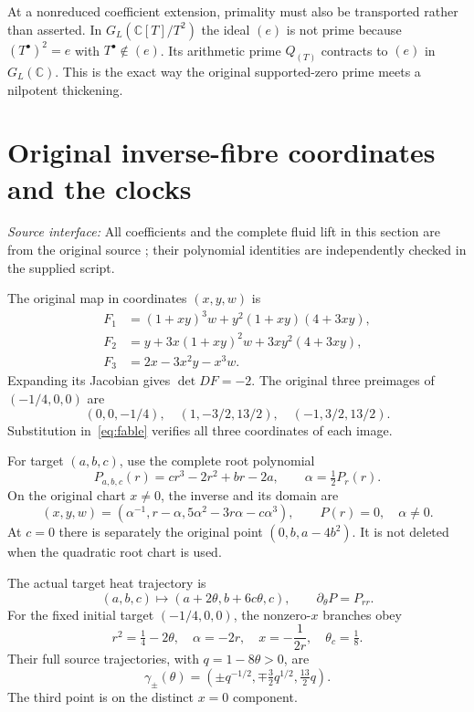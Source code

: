 \documentclass[11pt,a4paper]{article}
\theoremstyle{definition}\newtheorem{definition}[theorem]{Definition}\newtheorem{remark}[theorem]{Remark}
\newcommand{\C}{\mathbb C}\newcommand{\R}{\mathbb R}\newcommand{\Z}{\mathbb Z}\newcommand{\B}{\mathbb B}
\newcommand{\src}[1]{\textit{Source interface:} #1}
\begin{document}
At a nonreduced coefficient extension, primality must also be transported rather than asserted. In $G_L(\C[T]/T^2)$ the ideal $(e)$ is not prime because $(T^\bullet)^2=e$ with $T^\bullet\notin(e)$. Its arithmetic prime $Q_{(T)}$ contracts to $(e)$ in $G_L(\C)$. This is the exact way the original supported-zero prime meets a nilpotent thickening.

\section{Original inverse-fibre coordinates and the clocks}
\src{All coefficients and the complete fluid lift in this section are from the original source \cite{IFH}; their polynomial identities are independently checked in the supplied script.}

The original map in coordinates $(x,y,w)$ is
\begin{equation}
\begin{split}
 F_1&=(1+xy)^3w+y^2(1+xy)(4+3xy),\\
 F_2&=y+3x(1+xy)^2w+3xy^2(4+3xy),\\
 F_3&=2x-3x^2y-x^3w.
\end{split}                                               \label{eq:fable}
\end{equation}
Expanding its Jacobian gives $\det DF=-2$. The original three preimages of $(-1/4,0,0)$ are
\[
 (0,0,-1/4),\quad(1,-3/2,13/2),\quad(-1,3/2,13/2).
\]
Substitution in~\eqref{eq:fable} verifies all three coordinates of each image.

For target $(a,b,c)$, use the complete root polynomial
\begin{equation}
 P_{a,b,c}(r)=cr^3-2r^2+br-2a,
 \qquad \alpha=\tfrac12P_r(r).                            \label{eq:rootpoly}
\end{equation}
On the original chart $x\ne0$, the inverse and its domain are
\begin{equation}
 (x,y,w)=(\alpha^{-1},r-\alpha,5\alpha^2-3r\alpha-c\alpha^3),
 \qquad P(r)=0,\quad\alpha\ne0.                           \label{eq:inversef}
\end{equation}
At $c=0$ there is separately the original point $(0,b,a-4b^2)$. It is not deleted when the quadratic root chart is used.

The actual target heat trajectory is
\begin{equation}
 (a,b,c)\longmapsto(a+2\theta,b+6c\theta,c),\qquad
 \partial_\theta P=P_{rr}.                               \label{eq:forward}
\end{equation}
For the fixed initial target $(-1/4,0,0)$, the nonzero-$x$ branches obey
\begin{equation}
 r^2=\tfrac14-2\theta,\quad \alpha=-2r,\quad x=-\frac1{2r},
 \quad\theta_c=\tfrac18.                                 \label{eq:esc}
\end{equation}
Their full source trajectories, with $q=1-8\theta>0$, are
\begin{equation}
 \gamma_\pm(\theta)=
 (\pm q^{-1/2},\mp\tfrac32q^{1/2},\tfrac{13}2q).
                                                        \label{eq:gamma}
\end{equation}
The third point is on the distinct $x=0$ component.
\end{document}
